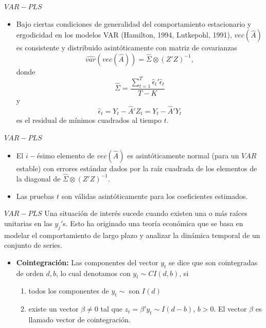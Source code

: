 \documentclass{beamer}
\newcommand{\?}{?`}
\begin{document}
\begin{frame}{$VAR-PLS$}
  \begin{itemize}
  \item Bajo ciertas condiciones de generalidad del comportamiento
    estacionario y ergodicidad en los modelos VAR (Hamilton, 1994,
    Lutkepohl, 1991), $vec(\hat{A})$ es consistente y distribuido
    asint\'oticamente con matriz de covarianzas
    \begin{displaymath}
      \widehat{var}\left(vec(\hat{A})\right)=\hat{\Sigma} \otimes
      (Z'Z)^{-1},
    \end{displaymath}
    donde
    \begin{displaymath}
      \hat{\Sigma}=\frac{\sum_{t=1}^T\hat{\epsilon}_t'\hat{\epsilon}_t}{T-K}
    \end{displaymath}
    y
    \begin{displaymath}
      \hat{\epsilon}_t=Y_t-\hat{A}'Z_t=Y_t-\hat{A}'Y_t
    \end{displaymath}
    es el residual de m\'inimos cuadrados al tiempo $t$.
  \end{itemize}
\end{frame}

\begin{frame}{$VAR-PLS$}
  \begin{itemize}
  \item El $i-$\'esimo elemento de $vec(\hat{A})$ es asint\'oticamente
    normal (para un $VAR$ estable) con errores est\'andar dados por la
    ra\'iz cuadrada de los elementos de la diagonal de $\hat{\Sigma}
    \otimes (Z'Z)^{-1}$.
    \item Las pruebas $t$ son v\'alidas asint\'oticamente para los
      coeficientes estimados.
  \end{itemize}
\end{frame}

\begin{frame}{$VAR-PLS$}
  Una situaci\'on de inter\'es sucede cuando existen una o m\'as
  ra\'ices unitarias en las $y_j'$s. Esto ha originado una teor\'ia
  econ\'omica que se basa en modelar el comportamiento de largo plazo
  y analizar la din\'amica temporal de un conjunto de series.
  \begin{itemize}
  \item \textbf{Cointegraci\'on: } Las componentes del vector $y_t$ se
    dice que son cointegradas de orden $d,b$, lo cual denotamos con
    $y_t\sim CI(d,b)$, si
    \begin{enumerate}
    \item todos los componentes de $y_t\sim$ son $I(d)$
    \item existe un vector $\beta\neq 0$ tal que $z_t=\beta'y_t\sim
      I(d-b)$, $b>0$. El vector $\beta$ es llamado vector de
      cointegraci\'on. 
    \end{enumerate}
  \end{itemize}
\end{frame}
\end{document}
